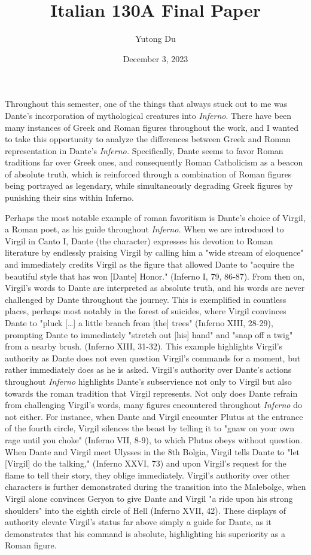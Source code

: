 \documentclass[12pt]{article}
\author{Yutong Du}
\date{December 3, 2023}
\title{Italian 130A Final Paper}
\begin{document}
	\maketitle

	Throughout this semester, one of the things that always stuck out to me was Dante's incorporation of mythological creatures 
	into \textit{Inferno}. There have been many instances of Greek and Roman figures throughout the work, 
	and I wanted to take this opportunity to analyze the differences between Greek and Roman representation 
	in Dante's \textit{Inferno.} Specifically, Dante seems to favor Roman traditions far over Greek ones, and consequently
	Roman Catholicism as a beacon of absolute truth, which is reinforced through a combination of Roman figures being 
	portrayed as legendary, while simultaneously degrading Greek figures by punishing their sins within Inferno. 

	Perhaps the most notable example of roman favoritism is Dante's choice of Virgil, a Roman poet, 
	as his guide throughout \textit{Inferno.} When
	we are introduced to Virgil in Canto I, Dante (the character) expresses his devotion to Roman literature by endlessly praising
	Virgil by calling him a "wide stream of eloquence" and immediately credits Virgil as the figure that allowed Dante to "acquire 
	the beautiful style that has won [Dante] Honor." (Inferno I, 79, 86-87). From then on, Virgil's words to Dante are interpreted as 
	absolute truth, and his words are never challenged by Dante throughout the journey. This is exemplified in countless places, 
	perhaps most notably in the forest of suicides, where Virgil convinces Dante to "pluck [\dots] a little branch from [the] trees"
	(Inferno XIII, 28-29), prompting Dante to immediately "stretch out [his] hand" and "snap off a twig" from a nearby brush. (Inferno
	XIII, 31-32). This example highlights Virgil's authority as Dante does not even question Virgil's commands for a moment, 
	but rather
	immediately does as he is asked. Virgil's authority over Dante's actions throughout \textit{Inferno} highlights Dante's 
	subservience not only to Virgil but also towards the roman tradition that Virgil represents. 
	Not only does Dante refrain from challenging Virgil's words, many figures encountered throughout \textit{Inferno} do not either.
	For instance, when Dante and Virgil encounter Plutus at the entrance of the fourth circle, Virgil silences the beast by telling 
	it to "gnaw on your own rage until you choke" (Inferno VII, 8-9), to which Plutus obeys without question. When Dante and Virgil 
	meet Ulysses in the 8th Bolgia, Virgil tells Dante to "let [Virgil] do the talking," (Inferno XXVI, 73) and upon Virgil's 
	request for the flame to tell their story, they oblige immediately. Virgil's authority 
	over other characters is further demonstrated during the transition into the Malebolge, when Virgil alone convinces Geryon to 
	give Dante and Virgil "a ride upon his strong shoulders" into the eighth circle of Hell (Inferno XVII, 42). These displays 
	of authority elevate Virgil's status far above simply a guide for Dante, as it demonstrates that his command is absolute, 
	highlighting his superiority as a Roman figure.  
\end{document}
